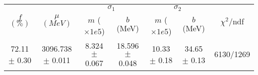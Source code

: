 \begin{tabular}{c|c|cc|cc||c}
 \multirow{2}{*}{$f$ $(\%)$} & \multirow{2}{*}{$\mu$ $(MeV)$} & \multicolumn{2}{|c|}{$\sigma_1$} & \multicolumn{2}{|c||}{$\sigma_2$} & \multirow{2}{*}{$\chi^2/$ndf} \\
 & & $m$ ($\times1e5$) & $b$ (MeV) & $m$ ($\times1e5$) & $b$ (MeV) & \\
\hline
72.11 $\pm$ 0.30 & 3096.738 $\pm$ 0.011 & 8.324 $\pm$ 0.067 & 18.596 $\pm$ 0.048 & 10.33 $\pm$ 0.18 & 34.65 $\pm$ 0.13 & 6130/1269\\
\end{tabular}
